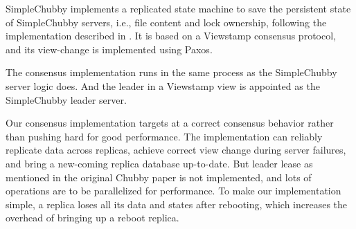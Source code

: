 SimpleChubby implements a replicated state machine to save the persistent
state of SimpleChubby servers, i.e., file content and lock ownership,
following the implementation described in \cite{mazieres2007paxos}.
It is based on a Viewstamp consensus protocol\cite{oki1988viewstamped},
and its view-change is implemented using Paxos\cite{lamport2001paxos}.

The consensus implementation runs in the same process
as the SimpleChubby server logic does.
And the leader in a Viewstamp view is appointed as the SimpleChubby leader server.

Our consensus implementation targets at a correct consensus behavior
rather than pushing hard for good performance.
The implementation can reliably replicate data across replicas,
achieve correct view change during server failures,
and bring a new-coming replica database up-to-date.
But leader lease as mentioned in the original Chubby paper is
not implemented,
and lots of operations are to be parallelized for performance.
To make our implementation simple,
a replica loses all its data and states after rebooting,
which increases the overhead of bringing up a reboot replica.

%
%
%
%
